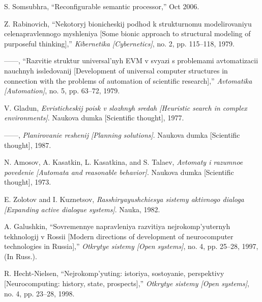 \documentclass{article}
\begin{document}
{\begin{multicols}{2}
{\begin{thebibliography}{65}
    \item S. Somsubhra, “Reconfigurable semantic processor,” Oct 2006.
    
    \item Z. Rabinovich, “Nekotoryj bionicheskij podhod k strukturnomu
modelirovaniyu celenapravlennogo myshleniya [Some bionic approach to structural modeling of purposeful thinking],” \textit{Kibernetika
[Cybernetics]}, no. 2, pp. 115–118, 1979.

    \item ——, “Razvitie struktur universal’nyh EVM v svyazi s problemami
avtomatizacii nauchnyh issledovanij [Development of universal
computer structures in connection with the problems of automation
of scientific research],” \textit{Avtomatika [Automation]}, no. 5, pp. 63–72,
1979.
    \item V. Gladun, \textit{Evristicheskij poisk v slozhnyh sredah [Heuristic search
in complex environments]}. Naukova dumka [Scientific thought],
1977.
    \item ——, \textit{Planirovanie reshenij [Planning solutions]}. Naukova dumka
[Scientific thought], 1987.
    \item N. Amosov, A. Kasatkin, L. Kasatkina, and S. Talaev, \textit{Avtomaty
i razumnoe povedenie [Automata and reasonable behavior]}.
Naukova dumka [Scientific thought], 1973.

    \item E. Zolotov and I. Kuznetsov, \textit{Rasshiryayushchiesya sistemy
aktivnogo dialoga [Expanding active dialogue systems]}. Nauka,
1982.
    \item A. Galushkin, “Sovremennye napravleniya razvitiya
nejrokomp’yuternyh tekhnologij v Rossii [Modern directions of
development of neurocomputer technologies in Russia],” \textit{Otkrytye
sistemy [Open systems]}, no. 4, pp. 25–28, 1997, (In Russ.).
    \item R. Hecht-Nielsen, “Nejrokomp’yuting: istoriya, sostoyanie, perspektivy [Neurocomputing: history, state, prospects],” \textit{Otkrytye
sistemy [Open systems]}, no. 4, pp. 23–28, 1998.


\end{thebibliography}}
\end{multicols}}
\end{document}
